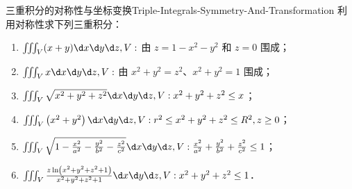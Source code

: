 \begin{problem}{三重积分的对称性与坐标变换}{Triple-Integrals-Symmetry-And-Transformation}
    利用对称性求下列三重积分：
    \begin{enumerate}
        \item $\iiint_{V} (x+y) \d x \d y \d z, V:$ 由 $z=1-x^{2}-y^{2}$ 和 $z=0$ 围成；
        \item $\iiint_{V} x \d x \d y \d z, V:$ 由 $x^{2}+y^{2}=z^{2}、x^{2}+y^{2}=1$ 围成；
        \item $\iiint_{V} \sqrt{x^{2}+y^{2}+z^{2}} \d x \d y \d z, V: x^{2}+y^{2}+z^{2} \le x$；
        \item $\iiint_{V}\left(x^{2}+y^{2}\right) \d x \d y \d z, V: r^{2} \le x^{2}+y^{2}+z^{2} \le R^{2}, z \ge 0$；
        \item $\iiint_{V} \sqrt{1-\frac{x^{2}}{a^{2}}-\frac{y^{2}}{b^{2}}-\frac{z^{2}}{c^{2}}} \d x \d y \d z, V: \frac{x^{2}}{a^{2}}+\frac{y^{2}}{b^{2}}+\frac{z^{2}}{c^{2}} \le 1$；
        \item $\iiint_{V} \frac{z \ln \left(x^{2}+y^{2}+z^{2}+1\right)}{x^{2}+y^{2}+z^{2}+1} \d x \d y \d z, V: x^{2}+y^{2}+z^{2} \le 1$．
    \end{enumerate}
\end{problem}

